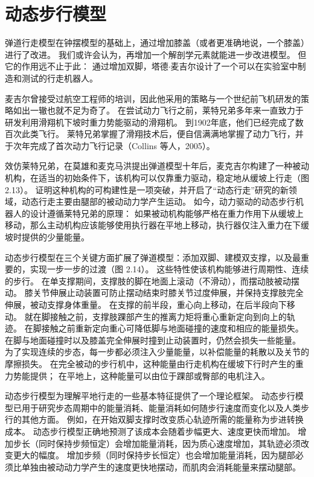 \section{动态步行模型}

弹道行走模型在钟摆模型的基础上，通过增加膝盖（或者更准确地说，一个膝盖）进行了改进。
我们或许会认为，再增加一个解剖学元素就能进一步改进模型。
但它的作用远不止于此：
通过增加双脚，塔德$\cdot$麦吉尔设计了一个可以在实验室中制造和测试的行走机器人。


麦吉尔曾接受过航空工程师的培训，因此他采用的策略与一个世纪前飞机研发的策略如出一辙也就不足为奇了。
在尝试动力飞行之前，莱特兄弟多年来一直致力于研发利用滑翔机下坡时重力势能驱动的滑翔机。
到1902年底，他们已经完成了数百次此类飞行。
莱特兄弟掌握了滑翔技术后，便自信满满地掌握了动力飞行，并于次年完成了首次动力飞行记录（Collins 等人，2005）。


效仿莱特兄弟，在莫雄和麦克马洪提出弹道模型十年后，麦克吉尔构建了一种被动机构，在适当的初始条件下，该机构可以仅靠重力驱动，稳定地从缓坡上行走（图 2.13）。
证明这种机构的可构建性是一项突破，并开启了“动态行走”研究的新领域，动态行走主要由腿部的被动动力学产生运动。
如今，动力驱动的动态步行机器人的设计遵循莱特兄弟的原理：
如果被动机构能够严格在重力作用下从缓坡上移动，那么主动机构应该能够使用执行器在平地上移动，执行器仅注入重力在下缓坡时提供的少量能量。



动态步行模型在三个关键方面扩展了弹道模型：添加双脚、建模双支撑，以及最重要的，实现一步一步的过渡（图 2.14）。
这些特性使该机构能够进行周期性、连续的步行。
在单支撑期间，支撑肢的脚在地面上滚动（不滑动），而摆动肢被动摆动。
膝关节伸展止动装置可防止摆动结束时膝关节过度伸展，并保持支撑肢完全伸展，被动支撑身体重量。
在支撑的前半段，重心向上移动，在后半段向下移动。
就在脚接触之前，支撑肢踝部产生的推离力矩将重心重新定向到向上的轨迹。
在脚接触之前重新定向重心可降低脚与地面碰撞的速度和相应的能量损失。
在脚与地面碰撞时以及膝盖完全伸展时撞到止动装置时，仍然会损失一些能量。
为了实现连续的步态，每一步都必须注入少量能量，以补偿能量的耗散以及关节的摩擦损失。
在完全被动的步行机中，这种能量由行走机构在缓坡下行时产生的重力势能提供；
在平地上，这种能量可以由位于踝部或臀部的电机注入。


动态步行模型为理解平地行走的一些基本特征提供了一个理论框架。
动态步行模型已用于研究步态周期中的能量消耗、能量消耗如何随步行速度而变化以及人类步行的其他方面。
例如，在开始双脚支撑时改变质心轨迹所需的能量称为步进转换成本。
动态步行模型正确地预测了该成本会随着步幅更大、速度更快而增加。
增加步长（同时保持步频恒定）会增加能量消耗，因为质心速度增加，其轨迹必须改变更大的幅度。
增加步频（同时保持步长恒定）也会增加能量消耗，因为腿部必须比单独由被动动力学产生的速度更快地摆动，而肌肉会消耗能量来摆动腿部。


